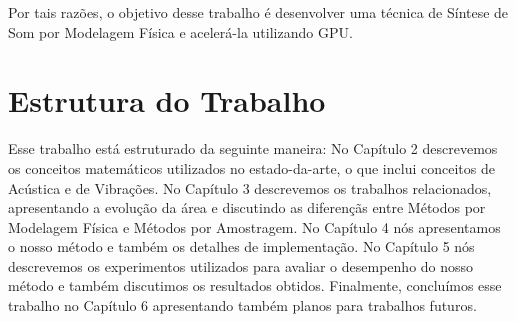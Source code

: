 Por tais razões, o objetivo desse trabalho é desenvolver uma técnica de Síntese de Som por Modelagem Física e acelerá-la utilizando GPU.

\section{Estrutura do Trabalho}

Esse trabalho está estruturado da seguinte maneira: No Capítulo 2 descrevemos os conceitos matemáticos utilizados no estado-da-arte, o que inclui conceitos de Acústica e de Vibrações. No Capítulo 3 descrevemos os trabalhos relacionados, apresentando a evolução da área e discutindo as diferençãs entre Métodos por Modelagem Física e Métodos por Amostragem. No Capítulo 4 nós apresentamos o nosso método e também os detalhes de implementação. No Capítulo 5 nós descrevemos os experimentos utilizados para avaliar o desempenho do nosso método e também discutimos os resultados obtidos. Finalmente, concluímos esse trabalho no Capítulo 6 apresentando também planos para trabalhos futuros.
